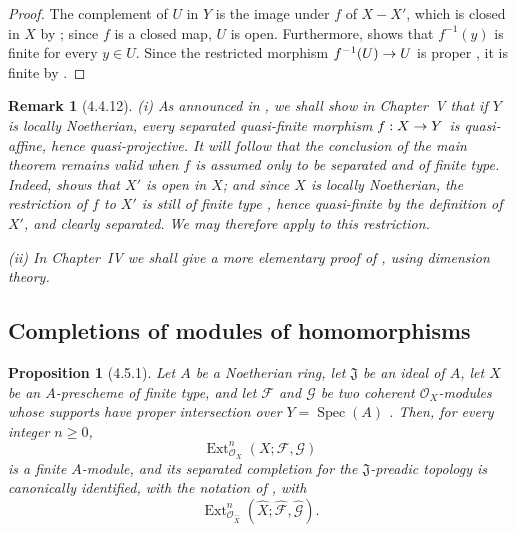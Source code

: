 \documentclass[oneside]{amsart}
\theoremstyle{ega-env-style}
\theoremstyle{ega-thm-env-style}
\newtheorem*{proposition}{Proposition}
\theoremstyle{ega-defn-env-style}
\newtheorem*{remark}{Remark}
\def\mathcal{\mathscr}
\def\sh{\mathcal}                   %
\def\geq{\geqslant}                 %
\def\Ext{\operatorname{Ext}}
\def\Spec{\operatorname{Spec}}
\renewcommand{\to}{\mathchoice{\longrightarrow}{\rightarrow}{\rightarrow}{\rightarrow}}
\renewcommand{\hat}[1]{\widehat{#1}}
\let\EGAOriginalLabel\label
\renewcommand{\label}[1]{\phantomsection\EGAOriginalLabel{#1}}
\begin{document}
\begin{proof}
The complement of $U$ in $Y$ is the image under $f$ of $X-X'$, which
is closed in $X$ by ; since $f$ is a closed map,
$U$ is open.  Furthermore,  shows that
$f^{-1}(y)$ is finite for every $y\in U$.  Since the restricted
morphism $f^{-1}(U)\to U$ is proper , it is finite
by .
\end{proof}

\begin{remark}[4.4.12]
\label{III.4.4.12}
\emph{(i)}
As announced in , we shall show in Chapter~V that
if $Y$ is locally Noetherian, every separated quasi-finite morphism
$f:X\to Y$ is quasi-affine, hence quasi-projective.  It will follow
that the conclusion of the main theorem  remains
valid when $f$ is assumed only to be separated and of finite type.
Indeed,  shows that $X'$ is open in $X$; and since
$X$ is locally Noetherian, the restriction of $f$ to $X'$ is still
of finite type , hence quasi-finite by the definition
of $X'$, and clearly separated.  We may therefore apply
 to this restriction.

\emph{(ii)}
In Chapter~IV we shall give a more elementary proof of
, using dimension theory.
\end{remark}


\subsection{Completions of modules of homomorphisms}
\label{subsection:III.4.5}

\begin{proposition}[4.5.1]
\label{III.4.5.1}
Let $A$ be a Noetherian ring, let $\mathfrak J$ be an ideal of $A$,
let $X$ be an $A$-prescheme of finite type, and let $\sh{F}$ and
$\sh{G}$ be two coherent $\sh{O}_X$-modules whose supports have
proper intersection over $Y=\Spec(A)$ .  Then,
for every integer $n\geq0$,
\[
  \Ext^n_{\sh{O}_X}(X;\sh{F},\sh{G})
\]
is a finite $A$-module, and its separated completion for the
$\mathfrak J$-preadic topology is canonically identified, with the
notation of , with
\[
  \Ext^n_{\sh{O}_{\hat{X}}}
    (\hat{X};\hat{\sh{F}},\hat{\sh{G}}).
\]
\end{proposition}
\end{document}
